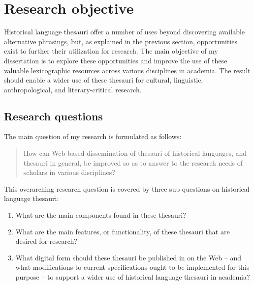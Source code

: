 


\section{Research objective} \label{sect:Introduction:Objectives}

Historical language thesauri offer a number of uses beyond discovering available alternative phrasings, but, as explained in the previous section, opportunities exist to further their utilization for research. The main objective of my dissertation is to explore these opportunities and improve the use of these valuable lexicographic resources across various disciplines in academia. The result should enable a wider use of these thesauri for cultural, linguistic, anthropological, and literary-critical research.

\subsection{Research questions}

The main question of my research is formulated as follows:

\begin{quote}\normalsize
How can Web-based dissemination of thesauri of historical languages, and thesauri in general, be improved so as to answer to the research needs of scholars in various disciplines?\end{quote}

\noindent This overarching research question is covered by three sub questions on historical language thesauri:
\begin{enumerate}
    \item What are the main components found in these thesauri?
    \item What are the main features, or functionality, of these thesauri that are desired for research?
    \item What digital form should these thesauri be published in on the Web -- and what modifications to current specifications ought to be implemented for this purpose -- to support a wider use of historical language thesauri in academia?
\end{enumerate}

